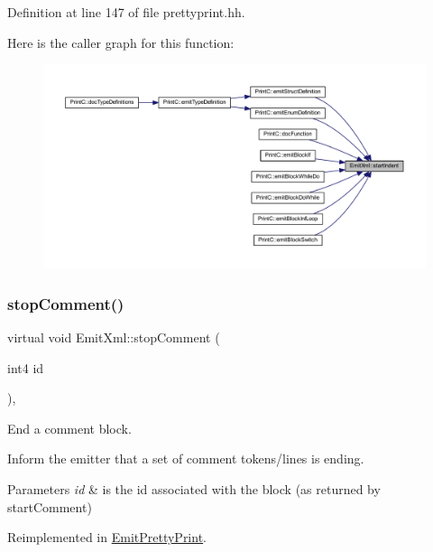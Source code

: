 Definition at line 147 of file prettyprint.\+hh.

Here is the caller graph for this function\+:
\nopagebreak
\begin{figure}[H]
\begin{center}
\leavevmode
\includegraphics[width=350pt]{class_emit_xml_ae9ed06a8d8049b22634eb06799d3ec3d_icgraph}
\end{center}
\end{figure}
\mbox{\label{class_emit_xml_abd12549a4f041d4358064a452ded5301}} 
\subsubsection{\texorpdfstring{stopComment()}{stopComment()}}
{\footnotesize\ttfamily virtual void Emit\+Xml\+::stop\+Comment (\begin{DoxyParamCaption}\item[{int4}]{id }\end{DoxyParamCaption})\hspace{0.3cm}{\ttfamily [inline]}, {\ttfamily [virtual]}}



End a comment block. 

Inform the emitter that a set of comment tokens/lines is ending. 
\begin{DoxyParams}{Parameters}
{\em id} & is the id associated with the block (as returned by start\+Comment) \\
\hline
\end{DoxyParams}


Reimplemented in \mbox{\hyperlink{class_emit_pretty_print_ad87969dcd6426529f85890b8ed6bb687}{Emit\+Pretty\+Print}}.



